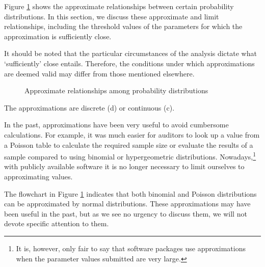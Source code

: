 Figure \ref{fig:H2Benaderingen} shows the approximate relationships between certain probability distributions. In this section, we discuss these approximate and limit relationships, including the threshold values of the parameters for which the approximation is sufficiently close.

It should be noted that the particular circumstances of the analysis dictate what `sufficiently' close entails. Therefore, the conditions under which approximations are deemed valid may differ from those mentioned elsewhere.

\begin{figure} 
\begin{center}
\caption{Approximate relationships among probability distributions}
\label{fig:H2Benaderingen}

\end{center}
\end{figure}

The approximations are discrete (d) or continuous (c). 

\bigskip
In the past, approximations have been very useful to avoid cumbersome calculations. For example, it was much easier for auditors to look up a value from a Poisson table to calculate the required sample size or evaluate the results of a sample compared to using binomial or hypergeometric distributions. Nowadays,\footnote{It is, however, only fair to say that software packages use approximations when the parameter values submitted are very large.} with publicly available software it is no longer necessary to limit ourselves to approximating values. 

The flowchart in Figure \ref{fig:H2Benaderingen} indicates that both  binomial and Poisson distributions can be approximated by normal distributions. These approximations may have been useful in the past, but as we see no urgency to discuss them, we will not devote specific attention to them.

